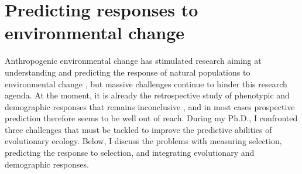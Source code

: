 \section{Predicting responses to environmental change}
Anthropogenic environmental change has stimulated research aiming at understanding and predicting the response of natural populations to environmental change \parencite{parmesan2006, Chevin2012, Smallegange2013, Charmantier2014climate}, but massive challenges continue to hinder this research agenda. At the moment, it is already the retrospective study of phenotypic and demographic responses that remains inconclusive \parencite{Merila2001,McCarty2001, Charmantier2014climate, Brookfield2016}, and in most cases prospective prediction therefore seems to be well out of reach. 
During my Ph.D., I confronted three challenges that must be tackled to improve the predictive abilities of evolutionary ecology. Below, I discuss the problems with measuring selection, predicting the response to selection, and integrating evolutionary and demographic responses.

